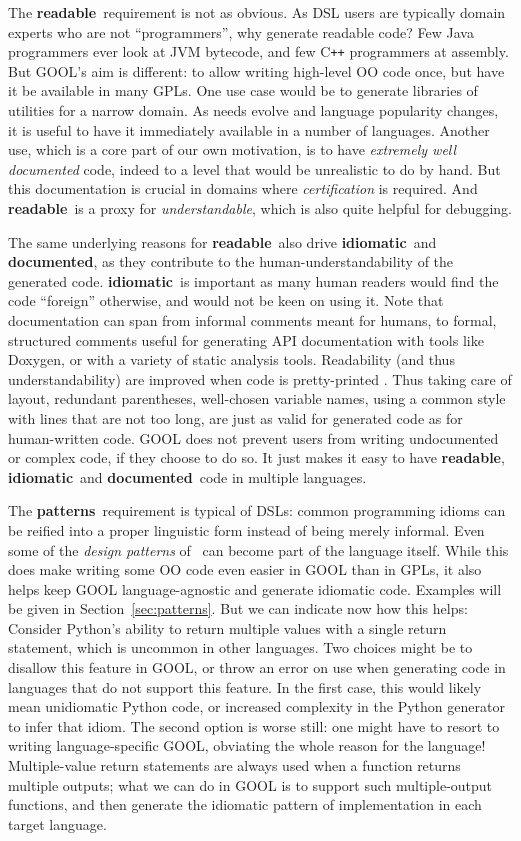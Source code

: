 \documentclass[sigplan,review,anonymous,prologue,dvipsnames]{acmart}
\newcommand{\Cplusplus}{C\texttt{++}}
\newcommand{\abbrev}[1]{\textbf{#1}}
\newcommand{\readable}{\abbrev{readable}}
\newcommand{\idiomatic}{\abbrev{idiomatic}}
\newcommand{\documented}{\abbrev{documented}}
\newcommand{\oopatterns}{\abbrev{patterns}}
\begin{document}
The \readable~requirement is not as obvious. As DSL users are typically
domain experts who are not ``programmers'', why generate readable code?
Few Java programmers ever look at JVM bytecode, and few \Cplusplus{} programmers
at assembly. But GOOL's aim is different: to allow writing
high-level OO code once, but have it be available in many GPLs. One use case
would be to generate libraries of utilities for a narrow domain. As needs
evolve and language popularity changes, it is useful to have it immediately
available in a number of languages. Another use, which is a core part of our
own motivation, is to have \emph{extremely well documented} code, indeed to
a level that would be unrealistic to do by hand. But this documentation is
crucial in domains where \emph{certification} is required.  And
\readable~is a proxy for \emph{understandable}, which is also quite
helpful for debugging.

The same underlying reasons for \readable~also drive \idiomatic~and \documented,
as they contribute to the human-understandability of the generated code.
\idiomatic~is important as many human readers would find the code ``foreign''
otherwise, and would not be keen on using it.
Note that documentation can span from informal comments meant for humans, to
formal, structured comments useful for generating API documentation with tools
like Doxygen, or with a variety of static analysis tools.
Readability (and thus understandability) are improved when code is 
pretty-printed%
\cite{buse2009learning}. Thus taking care of layout, redundant parentheses,
well-chosen variable names, using a common style with lines that are not too
long, are just as valid for generated code as for human-written code.
GOOL does not prevent users from writing undocumented or complex code, if they
choose to do so. It just makes it easy to have \readable, \idiomatic~and
\documented~code in multiple languages.

The \oopatterns~requirement is typical of DSLs: common programming idioms
can be reified into a proper linguistic form instead of being merely
informal. Even some of the \emph{design patterns} of~\cite{gamma1995design}
can become part of the language itself. While this does make writing some OO
code even easier in GOOL than in GPLs, it also helps
keep GOOL language-agnostic and generate idiomatic code.
Examples will be given in Section~\ref{sec:patterns}.  But we can
indicate now how this helps: Consider Python's
ability to return multiple values with a single return statement, which
is uncommon in other languages.  Two choices might be to disallow this
feature in GOOL, or throw an error on use when generating code in languages
that do not support this feature. In the first case, this would likely mean
unidiomatic Python code, or increased complexity in the Python generator to
infer that idiom. The second option is worse still: one might have to resort
to writing language-specific GOOL, obviating the whole reason for the language!
Multiple-value return statements are always used when a function returns multiple
outputs; what we can do in GOOL is to support such multiple-output functions,
and then generate the idiomatic pattern of implementation in each target
language.
\end{document}
